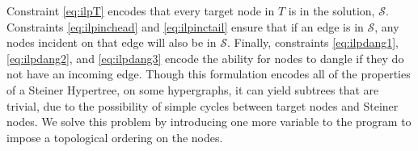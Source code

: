 \documentclass[12pt,twoside]{reedthesis}
\begin{document}
Constraint \eqref{eq:ilpT} encodes that every target node in $T$ is in the solution, $\mathcal{S}$.  Constraints \eqref{eq:ilpinchead} and \eqref{eq:ilpinctail} ensure that if an edge is in $\mathcal{S}$, any nodes incident on that edge will also be in $\mathcal{S}$.  Finally, constraints \eqref{eq:ilpdang1}, \eqref{eq:ilpdang2}, and \eqref{eq:ilpdang3} encode the ability for nodes to dangle if they do not have an incoming edge.  Though this formulation encodes all of the properties of a Steiner Hypertree, on some hypergraphs, it can yield subtrees that are trivial, due to the possibility of simple cycles between target nodes and Steiner nodes.  We solve this problem by introducing one more variable to the program to impose a topological ordering on the nodes. 
	
%
%
% 
\end{document}
